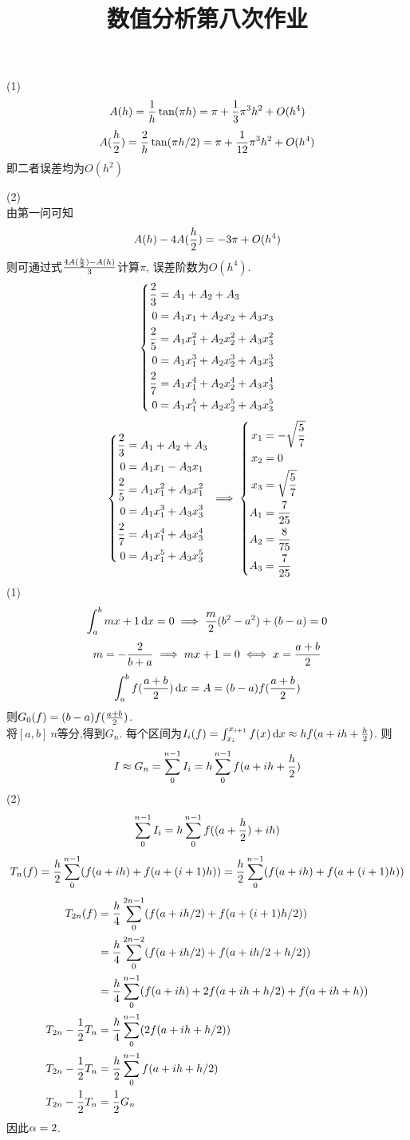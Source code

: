 \documentclass[UTF8,9pt]{ctexart}
\title{数值分析第八次作业}
\begin{document}
 
\maketitle
{}
(1)
$$A(h) = \frac{1}{h}\tan(\pi h) = \pi + \frac{1}{3}\pi^3h^2 +O(h^4)$$
$$A(\frac{h}{2}) = \frac{2}{h}\tan(\pi h/2) = \pi + \frac{1}{12}\pi^3h^2 +O(h^4)$$
即二者误差均为$O\left(h^{2}\right)$

(2) \\
由第一问可知
$$A(h)-4A(\frac{h}{2}) = -3\pi + O(h^4)$$
则可通过式$\frac{4A(\frac{h}{2})-A(h)}{3}$计算$\pi$, 误差阶数为$O(h^4)$.
$$ \left\{\begin{aligned} 
        \frac{2}{3} &= A_1+A_2+A_3\\
        0 &= A_1x_1+A_2x_2+A_3x_3\\
        \frac{2}{5} &= A_1x_1^2+A_2x_2^2+A_3x_3^2\\
        0 &= A_1x_1^3+A_2x_2^3+A_3x_3^3\\
        \frac{2}{7} &= A_1x_1^4+A_2x_2^4+A_3x_3^4\\
        0 &= A_1x_1^5+A_2x_2^5+A_3x_3^5
 \end{aligned}\right.$$
$$ \left\{\begin{aligned} 
        \frac{2}{3} &= A_1+A_2+A_3\\
        0 &= A_1x_1-A_3x_1\\
        \frac{2}{5} &= A_1x_1^2+A_3x_1^2\\
        0 &= A_1x_1^3+A_3x_3^3\\
        \frac{2}{7} &= A_1x_1^4+A_3x_3^4\\
        0 &= A_1x_1^5+A_3x_3^5
 \end{aligned}\right. \implies \left\{\begin{aligned} 
        x_1 &= -\sqrt{\frac{5}{7}}\\
        x_2 &= 0\\
        x_3 &= \sqrt{\frac{5}{7}}\\
        A_1 &= \frac{7}{25}\\
        A_2 &= \frac{8}{75}\\
        A_3 &= \frac{7}{25}
 \end{aligned}\right.$$
(1)
$$\int_a^b mx+1 \mathop{}\!\mathrm{d} x = 0 \implies \frac{m}{2}(b^2-a^2)+(b-a)=0$$
$$m = -\frac{2}{b+a}\implies mx+1 = 0 \iff x = \frac{a+b}{2}$$
$$\int_a^bf(\frac{a+b}{2})\mathop{}\!\mathrm{d} x = A = (b-a)f(\frac{a+b}{2})$$
则$G_0(f) = (b-a)f(\frac{a+b}{2})$. \\
将$[a,b]\ n$等分,得到$G_n$. 每个区间为$I_i(f) = \int_{x_i}^{x_{i+1}}f(x)\mathop{}\!\mathrm{d} x\approx hf(a+ih+\frac{h}{2})$. 
则$$I \approx G_n = \sum_0^{n-1} I_i = h \sum_0^{n-1} f(a+ih+\frac{h}{2})$$
(2)\\
$$\sum_0^{n-1} I_i = h \sum_0^{n-1} f((a+\frac{h}{2})+ih)$$
$$T_n(f) = \frac{h}{2}\sum_0^{n-1} (f(a+ih)+f(a+(i+1)h)) = \frac{h}{2}\sum_0^{n-1} (f(a+ih)+f(a+(i+1)h))$$
$$\begin{aligned} 
        \displaystyle T_{2n}(f) &=\displaystyle \frac{h}{4}\sum_0^{2n-1} (f(a+ih/2)+f(a+(i+1)h/2)) \\
        &=\displaystyle \frac{h}{4}\sum_0^{2n-2} (f(a+ih/2)+f(a+ih/2+h/2)) \\
        &=\displaystyle \frac{h}{4}\sum_0^{n-1} (f(a+ih)+2f(a+ih+h/2)+f(a+ih+h))\\
\displaystyle T_{2n}-\frac{1}{2}T_n &=\displaystyle \frac{h}{4}\sum_0^{n-1} (2f(a+ih+h/2))\\
\displaystyle T_{2n}-\frac{1}{2}T_n &=\displaystyle \frac{h}{2}\sum_0^{n-1}f(a+ih+h/2)\\
\displaystyle T_{2n}-\frac{1}{2}T_n &=\displaystyle \frac{1}{2}G_n
 \end{aligned}$$
因此$\alpha=2$.
\end{document}
